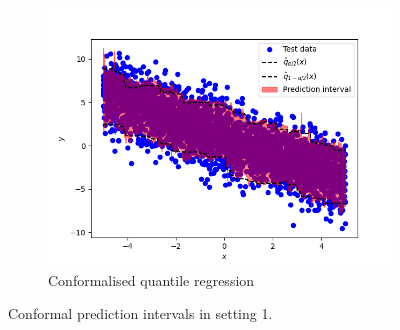 \documentclass[11pt, titlepage]{article} %
\numberwithin{equation}{section}
\theoremstyle{definition}
\numberwithin{theorem}{section}
\numberwithin{lemma}{section}
\numberwithin{corollary}{section}
\numberwithin{proposition}{section}
\numberwithin{definition}{section}
\numberwithin{remark}{section}
\begin{document}
\begin{figure}[H]
\begin{subfigure}{0.32\textwidth}
    \includegraphics[width=\linewidth]{figures/2_4_homoscedastic_CQR.png}    
    \caption{Conformalised quantile regression} \label{fig:2_4_homoscedastic_CQR}
    \end{subfigure}
    \caption{Conformal prediction intervals in setting 1.}
\label{fig:2_4_homoscedastic}
\end{figure}
\end{document}
